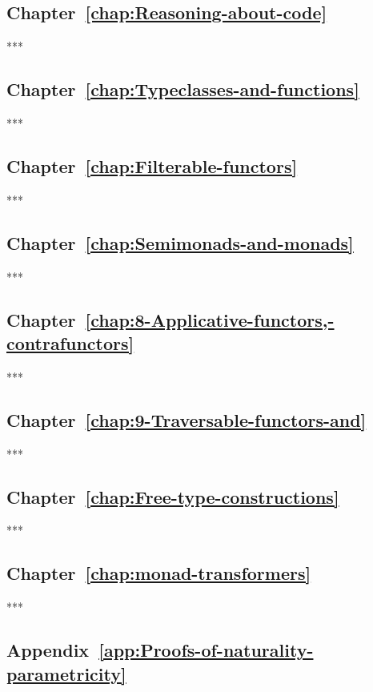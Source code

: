 \subsection{Chapter~\ref{chap:Reasoning-about-code}}

{*}{*}{*}

\subsection{Chapter~\ref{chap:Typeclasses-and-functions}}

{*}{*}{*}

\subsection{Chapter~\ref{chap:Filterable-functors}}

{*}{*}{*}

\subsection{Chapter~\ref{chap:Semimonads-and-monads}}

{*}{*}{*}

\subsection{Chapter~\ref{chap:8-Applicative-functors,-contrafunctors}}

{*}{*}{*}

\subsection{Chapter~\ref{chap:9-Traversable-functors-and}}

{*}{*}{*}

\subsection{Chapter~\ref{chap:Free-type-constructions}}

{*}{*}{*}

\subsection{Chapter~\ref{chap:monad-transformers}}

{*}{*}{*}

\subsection{Appendix~\ref{app:Proofs-of-naturality-parametricity}}


